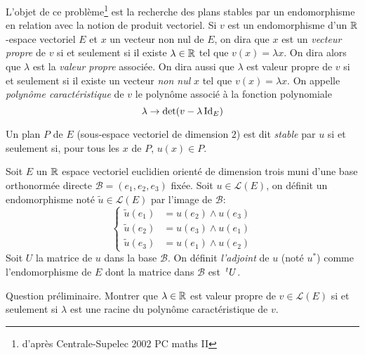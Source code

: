 L'objet de ce problème\footnote{d'après Centrale-Supelec 2002  PC maths II} est la recherche des plans stables par un endomorphisme en relation avec la notion de produit vectoriel.\newline
Si $v$ est un endomorphisme d'un $\mathbb{R}$-espace vectoriel $E$ et $x$ un vecteur non nul de $E$, on dira que $x$ est un \emph{vecteur propre} de $v$ si et seulement si il existe $\lambda\in \mathbb{R}$ tel que $v(x)=\lambda x$. On dira alors que $\lambda$ est la \emph{valeur propre} associée.\newline
On dira aussi que $\lambda$ est valeur propre de $v$ si et seulement si il existe un vecteur \emph{non nul} $x$ tel que $v(x)=\lambda x$.\newline
On appelle \emph{polynôme caractéristique} de $v$ le polynôme associé à la fonction polynomiale
\begin{displaymath}
 \lambda \rightarrow \det(v-\lambda \operatorname{Id}_E)
\end{displaymath}

Un plan $P$ de $E$ (sous-espace vectoriel de dimension $2$) est dit \emph{stable} par $u$ si et seulement si, pour tous les $x$ de $P$, $u(x)\in P$.

Soit $E$ un $\mathbb{R}$ espace vectoriel euclidien orienté de dimension trois muni d'une base orthonormée directe $\mathcal{B}=(e_1,e_2,e_3)$ fixée.\newline
Soit $u\in\mathcal{L}(E)$, on définit un endomorphisme noté $\widetilde{u}\in\mathcal{L}(E)$ par l'image de $\mathcal{B}$:
\begin{displaymath}
 \left\lbrace 
\begin{aligned}
 \widetilde{u}(e_1) &= u(e_2)\wedge u(e_3)\\
 \widetilde{u}(e_2) &= u(e_3)\wedge u(e_1)\\
 \widetilde{u}(e_3) &= u(e_1)\wedge u(e_2)
\end{aligned}
\right. 
\end{displaymath}
Soit $U$ la matrice de $u$ dans la base $\mathcal{B}$. On définit \emph{l'adjoint} de $u$ (noté $u^*$) comme l'endomorphisme de $E$ dont la matrice dans $\mathcal{B}$ est $\,\mathstrut^t\! \,U$.

Question préliminaire.\newline
Montrer que $\lambda\in \mathbb{R}$ est valeur propre de $v\in\mathcal{L}(E)$ si et seulement si $\lambda$ est une racine du polynôme caractéristique de $v$.
